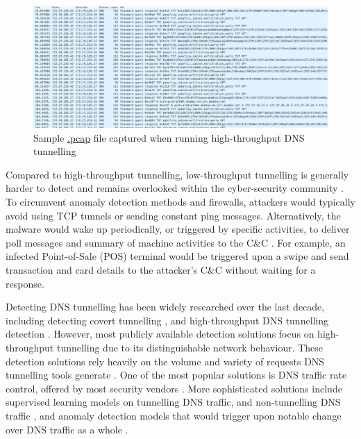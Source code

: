 \documentclass[a4paper]{report}
\begin{document}
\begin{figure}[h!]
  \includegraphics[width=\textwidth]{imgs/data-exfil-high-throughput-pcap.jpg}
  \caption{Sample \url{.pcap} file captured when running high-throughput DNS tunnelling}
  \label{fig:dns-high-throughput-tunnelling}
\end{figure}

Compared to high-throughput tunnelling, low-throughput tunnelling is generally harder to detect and remains overlooked within the cyber-security community \cite{nadler-2017, nadler-201936, ahmed-2020}.
To circumvent anomaly detection methods and firewalls, attackers would typically avoid using TCP tunnels or sending constant ping messages. Alternatively, the malware would wake up periodically, or triggered by specific activities, to deliver poll messages and summary of machine activities to the C\&C \cite{nadler-2018}. For example, an infected Point-of-Sale (POS) terminal would be triggered upon a swipe and send transaction and card details to the attacker's C\&C without waiting for a response.

Detecting DNS tunnelling has been widely researched over the last decade, including detecting covert tunnelling \cite{gilbert-2009, davis-2016}, and high-throughput DNS tunnelling detection \cite{wang-2016, buczak-2016, cambiaso-2016, engelstad-2017, homem-2017, kara-2014, sheridan-2015}. However, most publicly available detection solutions focus on high-throughput tunnelling due to its distinguishable network behaviour. These detection solutions rely heavily on the volume and variety of requests DNS tunnelling tools generate \cite{nadler-2017, nadler-2018}. One of the most popular solutions is DNS traffic rate control, offered by most security vendors \cite{homem-2017, nadler-2017}. More sophisticated solutions include supervised learning models on tunnelling DNS traffic, and non-tunnelling DNS traffic \cite{buczak-2016}, and anomaly detection models that would trigger upon notable change over DNS traffic as a whole \cite{davis-2016, sheridan-2015}.
\end{document}
